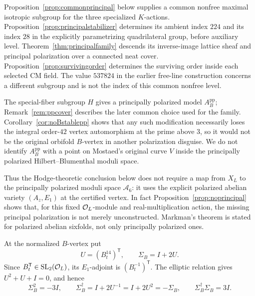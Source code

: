 \begin{remark}\label{rem:ppcover}
Proposition~\ref{prop:commonprincipal} below supplies a common nonfree
maximal isotropic subgroup for the three specialized $K$-actions.
Proposition~\ref{prop:principalstabilizer} determines its ambient index
$224$ and its index $28$ in the explicitly parametrizing quadrilateral
group, before auxiliary level. Theorem~\ref{thm:principalfamily} descends
its inverse-image lattice sheaf and principal polarization over a connected
neat cover. Proposition~\ref{prop:survivingorder} determines the surviving
order inside each selected CM field. The value $537824$ in the earlier
free-line construction concerns a different subgroup and is not the
index of this common nonfree level.
\end{remark}

\begin{remark}\label{rem:pphec}
The special-fiber subgroup $H$ gives a principally polarized model
$A_B^{\mathrm{pp}}$; Remark~\ref{rem:ppcover} describes the later common
choice used for the family. Corollary~\ref{cor:noBstablepp}
shows that any such modification necessarily loses the integral order-$42$
vertex automorphism at the prime above $3$, so it would not be the original
orbifold $B$-vertex in another polarization disguise.  We do not identify
$A_B^{\mathrm{pp}}$ with a point on Mostaed's original curve $V$ inside the
principally polarized Hilbert--Blumenthal moduli space.
\end{remark}

Thus the Hodge-theoretic conclusion below does not require a map from $X_L$ to the principally polarized moduli space $\mathcal A_6$: it uses the explicit polarized abelian variety $(A_z,E_1)$ at the certified vertex.  In fact Proposition~\ref{prop:noprincipal} shows that, for this fixed $\mathcal O_L$-module and real-multiplication action, the missing principal polarization is not merely unconstructed.  Markman's theorem is stated for polarized abelian sixfolds, not only principally polarized ones.

At the normalized $B$-vertex put
\[
 U=(B_t^{14})^{\mathsf T},\qquad \Sigma_B=I+2U.
\]
Since $B_t^{\mathsf T}\in\mathrm{SL}_2(\mathcal O_L)$, its $E_1$-adjoint is $(B_t^{-1})^{\mathsf T}$. The elliptic relation gives $U^2+U+I=0$, and hence
\[
 \Sigma_B^2=-3I,\qquad \Sigma_B^\dagger=I+2U^{-1}=I+2U^2=-\Sigma_B,\qquad \Sigma_B^\dagger \Sigma_B=3I.
\]

